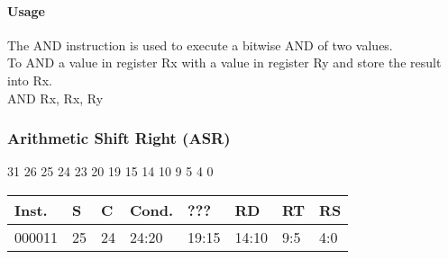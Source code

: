 \documentclass[12pt]{article}
\begin{document}
    \paragraph{Usage}
    \begin{flushleft}
    The AND instruction is used to execute a bitwise AND of two values.\\
    \vspace{1em}
    To AND a value in register Rx with a value in register Ry and store the result into Rx.\\
    \vspace{1em}
    AND Rx, Rx, Ry
    \end{flushleft}
   
   




    \newpage
    \subsubsection{Arithmetic Shift Right (ASR)}
    
    \hspace{1.6cm}31 \hspace{1.2cm}26 \hspace{.075cm}25 \hspace{.15cm}24 \hspace{.075cm}23 \hspace{.875cm}20 \hspace{.04cm}19 \hspace{.8cm}15 \hspace{.04cm}14 \hspace{.8cm}10 \hspace{.04cm}9 \hspace{1.15cm}5 \hspace{.04cm}4 \hspace{1.25cm}0
    \vspace{-.25cm}
    \begin{center}
        \begin{tabular}{ |p{1.8cm}|p{.3cm}|p{.3cm}|p{1.5cm}|p{1.5cm}|p{1.5cm}|p{1.5cm}|p{1.5cm}| }
            \hline
            \textbf{Inst.} & \textbf{S}& \textbf{C} & \textbf{Cond.} & ??? & \textbf{RD} & \textbf{RT} & \textbf{RS}\\
            \hline
            000011& 25 & 24 & 24:20 & 19:15 & 14:10 & 9:5 & 4:0\\
            \hline
        \end{tabular}
    \end{center}
    
\end{document}
